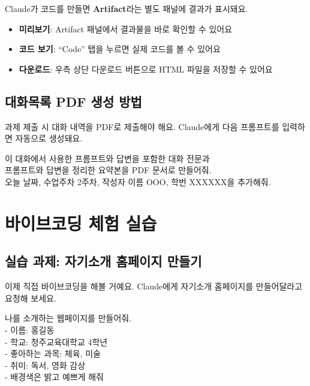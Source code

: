 \documentclass[11pt, a4paper]{article}
\begin{document}
Claude가 코드를 만들면 \textbf{Artifact}라는 별도 패널에 결과가 표시돼요.

\begin{itemize}[leftmargin=1.5em]
\item \textbf{미리보기}: Artifact 패널에서 결과물을 바로 확인할 수 있어요
\item \textbf{코드 보기}: ``Code'' 탭을 누르면 실제 코드를 볼 수 있어요
\item \textbf{다운로드}: 우측 상단 다운로드 버튼으로 HTML 파일을 저장할 수 있어요
\end{itemize}

\subsection{대화목록 PDF 생성 방법}

과제 제출 시 대화 내역을 PDF로 제출해야 해요. Claude에게 다음 프롬프트를 입력하면 자동으로 생성돼요.

\begin{promptbox}
이 대화에서 사용한 프롬프트와 답변을 포함한 대화 전문과\\
프롬프트와 답변을 정리한 요약본을 PDF 문서로 만들어줘.\\
오늘 날짜, 수업주차 2주차, 작성자 이름 OOO, 학번 XXXXXX을 추가해줘.
\end{promptbox}

\section{바이브코딩 체험 실습}

\subsection{실습 과제: 자기소개 홈페이지 만들기}

이제 직접 바이브코딩을 해볼 거예요. Claude에게 자기소개 홈페이지를 만들어달라고 요청해 보세요.

\begin{promptbox}
나를 소개하는 웹페이지를 만들어줘.\\
- 이름: 홍길동\\
- 학교: 청주교육대학교 4학년\\
- 좋아하는 과목: 체육, 미술\\
- 취미: 독서, 영화 감상\\
- 배경색은 밝고 예쁘게 해줘
\end{promptbox}
\end{document}
